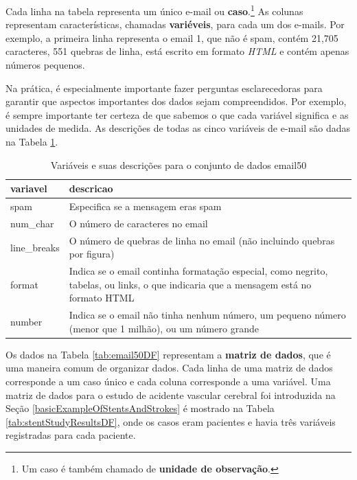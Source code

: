 \documentclass[
]{book}
\theoremstyle{definition}
\theoremstyle{definition}
\theoremstyle{definition}
\theoremstyle{definition}
\theoremstyle{remark}
\begin{document}
Cada linha na tabela representa um único e-mail ou \textbf{caso}.\footnote{Um caso é também chamado de \textbf{unidade de observação}.} As colunas representam características, chamadas \textbf{variéveis}, para cada um dos e-mails. Por exemplo, a primeira linha representa o email 1, que não é spam, contém 21,705 caracteres, 551 quebras de linha, está escrito em formato \emph{HTML} e contém apenas números pequenos.

Na prática, é especialmente importante fazer perguntas esclarecedoras para garantir que aspectos importantes dos dados sejam compreendidos. Por exemplo, é sempre importante ter certeza de que sabemos o que cada variável significa e as unidades de medida. As descrições de todas as cinco variáveis de e-mail são dadas na Tabela \ref{tab:email50Variables}.

\begin{table}

\caption{\label{tab:email50Variables}Variáveis e suas descrições para o conjunto de dados email50}
\centering
\begin{tabular}[t]{>{\raggedleft\arraybackslash}p{15em}|>{\raggedleft\arraybackslash}p{15em}}
\hline
variavel & descricao\\
\hline
spam & Especifica se a mensagem eras spam\\
\hline
num\_char & O número de caracteres no email\\
\hline
line\_breaks & O número de quebras de linha no email (não incluindo quebras por figura)\\
\hline
format & Indica se o email continha formatação especial, como negrito, tabelas, ou links, o que indicaria que a mensagem está no formato HTML\\
\hline
number & Indica se o email não tinha nenhum número, um pequeno número (menor que 1 milhão), ou um número grande\\
\hline
\end{tabular}
\end{table}

Os dados na Tabela \ref{tab:email50DF} representam a \textbf{matriz de dados}, que é uma maneira comum de organizar dados. Cada linha de uma matriz de dados corresponde a um caso único e cada coluna corresponde a uma variável. Uma matriz de dados para o estudo de acidente vascular cerebral foi introduzida na Seção \ref{basicExampleOfStentsAndStrokes} é mostrado na Tabela \ref{tab:stentStudyResultsDF}, onde os casos eram pacientes e havia três variáveis registradas para cada paciente.
\end{document}
